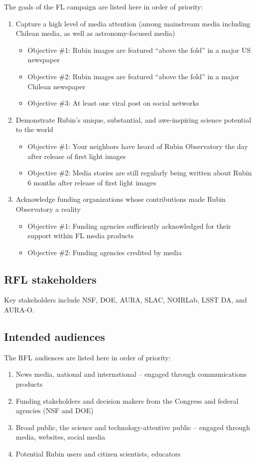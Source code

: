 The goals of the FL campaign are listed here in order of priority:
\begin{enumerate}
\item Capture a high level of media attention (among mainstream media including Chilean media, as well as astronomy-focused media)
\begin{itemize}
  \item Objective \#1: Rubin images are featured ``above the fold'' in a major US newspaper 
  \item Objective \#2: Rubin images are featured ``above the fold'' in a major Chilean newspaper
  \item Objective \#3: At least one viral post on social networks 
\end{itemize}
\item Demonstrate Rubin's unique, substantial, and awe-inspiring science potential to the world
\begin{itemize}
  \item Objective \#1: Your neighbors have heard of Rubin Observatory the day after release of first light images
  \item Objective \#2: Media stories are still regularly being written about Rubin 6 months after release of first light images
\end{itemize}
\item Acknowledge funding organizations whose contributions made Rubin Observatory a reality
\begin{itemize}
  \item Objective \#1: Funding agencies sufficiently acknowledged for their support within FL media products
  \item Objective \#2: Funding agencies credited by media
\end{itemize}
\end{enumerate} 


\subsection{RFL stakeholders}

Key stakeholders include NSF, DOE, AURA, SLAC, NOIRLab, LSST DA, and AURA-O.

\subsection{Intended audiences}

The RFL audiences are listed here in order of priority:
\begin{enumerate}
\item News media, national and international -- engaged through communications products
\item Funding stakeholders and decision makers from the Congress and federal agencies (NSF and DOE)
\item Broad public, the science and technology-attentive public -- engaged through media, websites, social media
\item Potential Rubin users and citizen scientists, educators
\end{enumerate}


